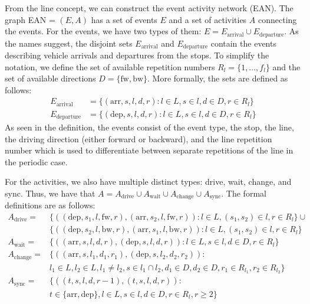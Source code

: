 \documentclass[english, 12pt, a4paper, sci, utf8, a-2b, online]{aaltothesis}
\begin{document}
From the line concept, we can construct the event activity network (EAN). The graph EAN = $(E, A)$ has a set of events $E$ and a set of activities $A$ connecting the events. For the events, we have two types of them: $E = E_\text{arrival} \cup E_\text{departure}$. As the names suggest, the disjoint sets $E_\text{arrival}$ and $E_\text{departure}$ contain the events describing vehicle arrivals and departures from the stops. To simplify the notation, we define the set of available repetition numbers $R_l = \{1, \dots, f_l\}$ and the set of available directions $D = \{\text{fw}, \text{bw}\}$. More formally, the sets are defined as follows:
\begin{align*}
    E_\text{arrival} &= \{
        (\text{arr}, s, l, d, r) : l \in L, s \in l, d \in D, r \in R_l
    \} \\
    E_\text{departure} &= \{
        (\text{dep}, s, l, d, r) : l \in L, s \in l, d \in D, r \in R_l
    \}
\end{align*}
As seen in the definition, the events consist of the event type, the stop, the line, the driving direction (either forward or backward), and the line repetition number which is used to differentiate between separate repetitions of the line in the periodic case.

For the activities, we also have multiple distinct types: drive, wait, change, and sync. Thus, we have that $A = A_\text{drive} \cup A_\text{wait} \cup A_\text{change} \cup A_\text{sync}$. The formal definitions are as follows:
\begin{align*}
    A_\text{drive} =& \{(
        (\text{dep}, s_1, l, \text{fw}, r),
        (\text{arr}, s_2, l, \text{fw}, r)
    ): l \in L, (s_1, s_2) \in l, r \in R_l\} \cup \\
    &\{(
        (\text{dep}, s_2, l, \text{bw}, r),
        (\text{arr}, s_1, l, \text{bw}, r)
    ): l \in L, (s_1, s_2) \in l, r \in R_l\} \\
    A_\text{wait} =& \{(
        (\text{arr}, s, l, d, r),
        (\text{dep}, s, l, d, r)
    ): l \in L, s \in l, d \in D, r \in R_l\} \\
    A_\text{change} =& \{(
        (\text{arr}, s, l_1, d_1, r_1),
        (\text{dep}, s, l_2, d_2, r_2)
    ): \\&l_1 \in L, l_2 \in L, l_1 \neq l_2, s \in l_1 \cap l_2, d_1 \in D, d_2 \in D, r_1 \in R_{l_1}, r_2 \in R_{l_2}\} \\
    A_\text{sync} =& \{(
       (t, s, l, d, r-1),
       (t, s, l, d, r)
    ):\\ &t\in \{\text{arr}, \text{dep}\}, l \in L, s \in l, d \in D, r \in R_l, r \geq 2 \}
\end{align*}
\end{document}
